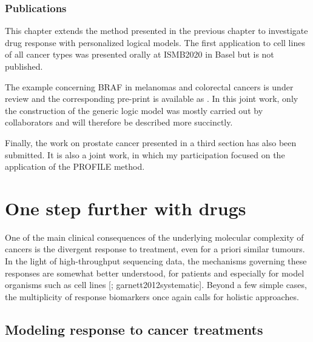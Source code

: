 \documentclass[a4paper,12pt,twoside,onecolumn,openright,final,oldfontcommands]{memoir}
\begin{document}
\subsubsection*{Publications}\label{publications-2}

This chapter extends the method presented in the previous chapter to
investigate drug response with personalized logical models. The first
application to cell lines of all cancer types was presented orally at
ISMB2020 in Basel but is not published.

The example concerning BRAF in melanomas and colorectal cancers is under
review and the corresponding pre-print is available as
\citet{beal2020personalized}. In this joint work, only the construction
of the generic logic model was mostly carried out by collaborators and
will therefore be described more succinctly.

Finally, the work on prostate cancer presented in a third section has
also been submitted. It is also a joint work, in which my participation
focused on the application of the PROFILE method.

\section{One step further with drugs}\label{one-step-further-with-drugs}

One of the main clinical consequences of the underlying molecular
complexity of cancers is the divergent response to treatment, even for a
priori similar tumours. In the light of high-throughput sequencing data,
the mechanisms governing these responses are somewhat better understood,
for patients and especially for model organisms such as cell lines
{[}\citet{heiser2012subtype}; garnett2012systematic{]}. Beyond a few
simple cases, the multiplicity of response biomarkers once again calls
for holistic approaches.

\subsection{Modeling response to cancer
treatments}\label{modeling-response-to-cancer-treatments}
\end{document}
